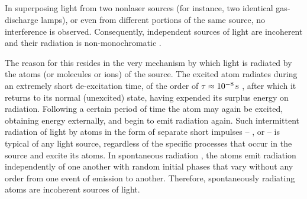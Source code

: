 \subsection{}\label{32.1.3} In superposing light from two nonlaser sources (for instance, two identical gas-discharge lamps), or even from different portions of the same source, no interference  is observed. Consequently, independent sources of light are incoherent  and their radiation is non-monochromatic
. 

The reason for this resides in the very mechanism by which light is radiated by the atoms (or molecules or ions) of the source. The excited atom radiates during an extremely
short de-excitation time, of the order of $\tau \approx \SI{d-8}{\second}$ , after which it returns to its normal (unexcited) state, having expended its surplus energy on radiation. Following a certain period of time the atom may again be excited, obtaining energy externally, and begin to emit radiation again. Such intermittent radiation of light by atoms in the form of separate short impulses -- , or  -- is typical of any light source, regardless of the specific processes that occur in the source and excite its atoms. In spontaneous radiation , the atoms emit radiation independently of one another with random initial phases that vary without any order from one event of emission to another. Therefore, spontaneously radiating atoms are incoherent sources of light.


